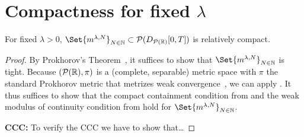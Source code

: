 \section{Compactness for fixed \texorpdfstring{\(\lambda\)}{lambda}}

\begin{theorem}
  For fixed \(\lambda > 0\), \(\Set{ \lawmu^{\lambda, N} }_{N\in\bN} \subset \cP(D_{\cP(\potspace)}[0,T])\) is relatively compact.
\end{theorem}

\begin{proof}
  By Prokhorov's Theorem~\cite[Theorem 5.1]{billingsleyConvergenceProbabilityMeasures1999}, it suffices to show that \(\Set{ \lawmu^{\lambda, N} }_{N\in\bN}\) is tight.
  Because \((\mathcal{P}(\mathbb{R}), \pi)\) is a (complete, separable) metric space with \( \pi \) the standard Prokhorov metric that metrizes weak convergence~\cite[Theorem 6.8]{billingsleyConvergenceProbabilityMeasures1999}, we can apply .
  It thus suffices to show that the compact containment condition from  and the weak modulus of continuity condition from  hold for \( \Set{ \lawmu^{\lambda, N} }_{N\in\bN} \).

  \textbf{CCC:}
  To verify the CCC we have to show that\dots


  \bigskip


\end{proof}
